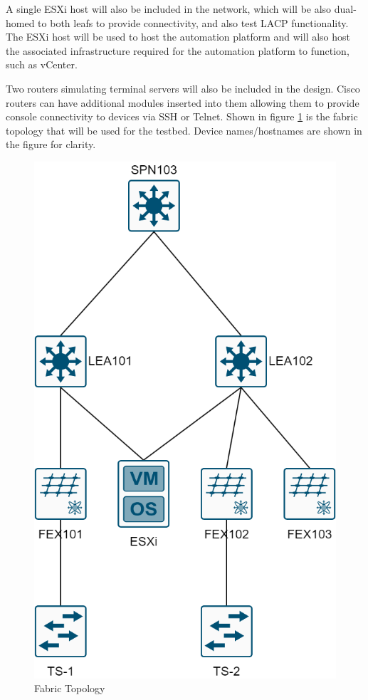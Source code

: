 A single ESXi host will also be included in the network, which will be also dual-homed to both leafs to provide connectivity, and also test LACP functionality. The ESXi host will be used to host the automation platform and will also host the associated infrastructure required for the automation platform to function, such as vCenter.

Two routers simulating terminal servers will also be included in the design. Cisco routers can have additional modules inserted into them allowing them to provide console connectivity to devices via SSH or Telnet.
Shown in figure \ref{fig:fabric-topology} is the fabric topology that will be used for the testbed. Device names/hostnames are shown in the figure for clarity.

\begin{figure}[H]
    \centering
    \includegraphics[scale=0.3]{images/aci-topology.png}
    \caption{Fabric Topology}
    \label{fig:fabric-topology}
\end{figure}

